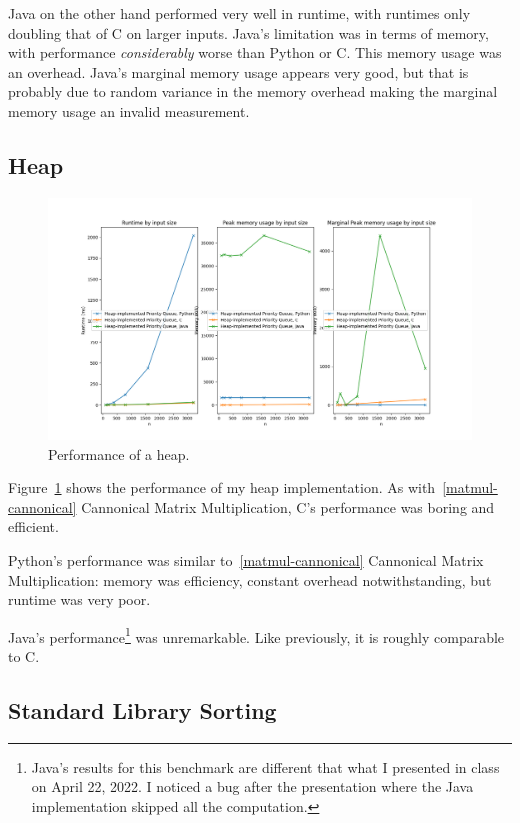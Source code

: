\documentclass[12pt,letterpaper]{article}
\begin{document}
Java on the other hand performed very well in runtime, with runtimes only
doubling that of C on larger inputs. Java's limitation was in terms of memory,
with performance \emph{considerably} worse than Python or C. This memory usage
was an overhead. Java's marginal memory usage appears very good, but that is
probably due to random variance in the memory overhead making the marginal
memory usage an invalid measurement.

\subsection{Heap}\label{heap}

\begin{figure}[H]
  \centering
  \includegraphics[width=\textwidth]{./heap-plot.png}
  \caption{Performance of a heap.}
  \label{plot-heap}
\end{figure}

Figure~\ref{plot-heap} shows the performance of my heap implementation. As
with~\ref{matmul-cannonical} Cannonical Matrix Multiplication, C's performance
was boring and efficient.

Python's performance was similar to~\ref{matmul-cannonical} Cannonical Matrix
Multiplication: memory was efficiency, constant overhead notwithstanding, but
runtime was very poor.

Java's performance\footnote{Java's results for this benchmark are different
that what I presented in class on April 22, 2022. I noticed a bug after the
presentation where the Java implementation skipped all the computation.} was
unremarkable. Like previously, it is roughly comparable to C.

\subsection{Standard Library Sorting}\label{sort}
\end{document}
